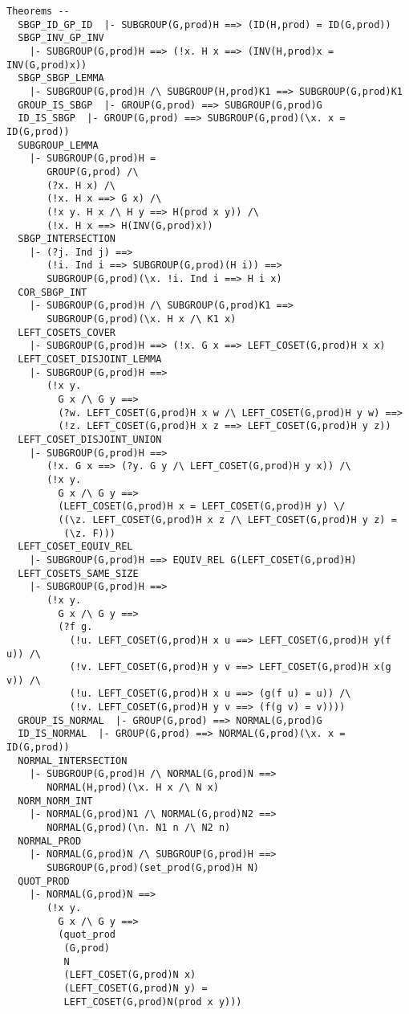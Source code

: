 \begin{verbatim}
Theorems --
  SBGP_ID_GP_ID  |- SUBGROUP(G,prod)H ==> (ID(H,prod) = ID(G,prod))
  SBGP_INV_GP_INV
    |- SUBGROUP(G,prod)H ==> (!x. H x ==> (INV(H,prod)x = INV(G,prod)x))
  SBGP_SBGP_LEMMA
    |- SUBGROUP(G,prod)H /\ SUBGROUP(H,prod)K1 ==> SUBGROUP(G,prod)K1
  GROUP_IS_SBGP  |- GROUP(G,prod) ==> SUBGROUP(G,prod)G
  ID_IS_SBGP  |- GROUP(G,prod) ==> SUBGROUP(G,prod)(\x. x = ID(G,prod))
  SUBGROUP_LEMMA
    |- SUBGROUP(G,prod)H =
       GROUP(G,prod) /\
       (?x. H x) /\
       (!x. H x ==> G x) /\
       (!x y. H x /\ H y ==> H(prod x y)) /\
       (!x. H x ==> H(INV(G,prod)x))
  SBGP_INTERSECTION
    |- (?j. Ind j) ==>
       (!i. Ind i ==> SUBGROUP(G,prod)(H i)) ==>
       SUBGROUP(G,prod)(\x. !i. Ind i ==> H i x)
  COR_SBGP_INT
    |- SUBGROUP(G,prod)H /\ SUBGROUP(G,prod)K1 ==>
       SUBGROUP(G,prod)(\x. H x /\ K1 x)
  LEFT_COSETS_COVER
    |- SUBGROUP(G,prod)H ==> (!x. G x ==> LEFT_COSET(G,prod)H x x)
  LEFT_COSET_DISJOINT_LEMMA
    |- SUBGROUP(G,prod)H ==>
       (!x y.
         G x /\ G y ==>
         (?w. LEFT_COSET(G,prod)H x w /\ LEFT_COSET(G,prod)H y w) ==>
         (!z. LEFT_COSET(G,prod)H x z ==> LEFT_COSET(G,prod)H y z))
  LEFT_COSET_DISJOINT_UNION
    |- SUBGROUP(G,prod)H ==>
       (!x. G x ==> (?y. G y /\ LEFT_COSET(G,prod)H y x)) /\
       (!x y.
         G x /\ G y ==>
         (LEFT_COSET(G,prod)H x = LEFT_COSET(G,prod)H y) \/
         ((\z. LEFT_COSET(G,prod)H x z /\ LEFT_COSET(G,prod)H y z) =
          (\z. F)))
  LEFT_COSET_EQUIV_REL
    |- SUBGROUP(G,prod)H ==> EQUIV_REL G(LEFT_COSET(G,prod)H)
  LEFT_COSETS_SAME_SIZE
    |- SUBGROUP(G,prod)H ==>
       (!x y.
         G x /\ G y ==>
         (?f g.
           (!u. LEFT_COSET(G,prod)H x u ==> LEFT_COSET(G,prod)H y(f u)) /\
           (!v. LEFT_COSET(G,prod)H y v ==> LEFT_COSET(G,prod)H x(g v)) /\
           (!u. LEFT_COSET(G,prod)H x u ==> (g(f u) = u)) /\
           (!v. LEFT_COSET(G,prod)H y v ==> (f(g v) = v))))
  GROUP_IS_NORMAL  |- GROUP(G,prod) ==> NORMAL(G,prod)G
  ID_IS_NORMAL  |- GROUP(G,prod) ==> NORMAL(G,prod)(\x. x = ID(G,prod))
  NORMAL_INTERSECTION
    |- SUBGROUP(G,prod)H /\ NORMAL(G,prod)N ==>
       NORMAL(H,prod)(\x. H x /\ N x)
  NORM_NORM_INT
    |- NORMAL(G,prod)N1 /\ NORMAL(G,prod)N2 ==>
       NORMAL(G,prod)(\n. N1 n /\ N2 n)
  NORMAL_PROD
    |- NORMAL(G,prod)N /\ SUBGROUP(G,prod)H ==>
       SUBGROUP(G,prod)(set_prod(G,prod)H N)
  QUOT_PROD
    |- NORMAL(G,prod)N ==>
       (!x y.
         G x /\ G y ==>
         (quot_prod
          (G,prod)
          N
          (LEFT_COSET(G,prod)N x)
          (LEFT_COSET(G,prod)N y) =
          LEFT_COSET(G,prod)N(prod x y)))

\end{verbatim}
